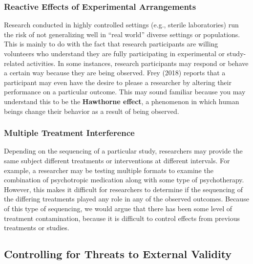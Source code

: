 \documentclass[
  11pt,
]{book}
\begin{document}
\hypertarget{reactive-effects-of-experimental-arrangements}{%
\subsubsection{Reactive Effects of Experimental Arrangements}\label{reactive-effects-of-experimental-arrangements}}

Research conducted in highly controlled settings (e.g., sterile laboratories) run the risk of not generalizing well in ``real world'' diverse settings or populations. This is mainly to do with the fact that research participants are willing volunteers who understand they are fully participating in experimental or study-related activities. In some instances, research participants may respond or behave a certain way because they are being observed. Frey (2018) reports that a participant may even have the desire to please a researcher by altering their performance on a particular outcome. This may sound familiar because you may understand this to be the \textbf{Hawthorne effect}, a phenomenon in which human beings change their behavior as a result of being observed.

\hypertarget{multiple-treatment-interference}{%
\subsubsection{Multiple Treatment Interference}\label{multiple-treatment-interference}}

Depending on the sequencing of a particular study, researchers may provide the same subject different treatments or interventions at different intervals. For example, a researcher may be testing multiple formats to examine the combination of psychotropic medication along with some type of psychotherapy. However, this makes it difficult for researchers to determine if the sequencing of the differing treatments played any role in any of the observed outcomes. Because of this type of sequencing, we would argue that there has been some level of treatment contamination, because it is difficult to control effects from previous treatments or studies.

\hypertarget{controlling-for-threats-to-external-validity}{%
\subsection{Controlling for Threats to External Validity}\label{controlling-for-threats-to-external-validity}}
\end{document}
